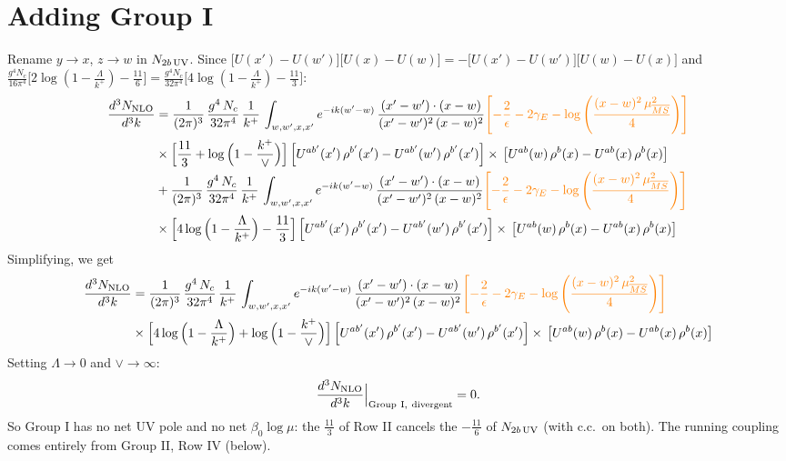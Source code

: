 \documentclass[9pt]{article}
\numberwithin{equation}{section}
\begin{document}
\section{Adding Group I}
Rename $y\to x$, $z\to w$ in $N_{2b\,\rm UV}$. Since $\big[U(x')-U(w')\big]\big[U(x)-U(w)\big]=-\big[U(x')-U(w')\big]\big[U(w)-U(x)\big]$ and $\frac{g^{4}N_{c}}{16\pi^{4}}\big[2\log(1-\frac{\Lambda}{k^{+}})-\frac{11}{6}\big]=\frac{g^{4}N_{c}}{32\pi^{4}}\big[4\log(1-\frac{\Lambda}{k^{+}})-\frac{11}{3}\big]$:
\begin{align}
\frac{d^{3}N_{\rm NLO}}{d^{3}k} & = \frac{1}{(2\pi)^{3}}\, \frac{g^{4}\,N_{c}}{32\pi^{4}}\,\frac{1}{k^{+}}\, \int_{w, w',x,x'} e^{-ik(w^\prime-w)}\,\frac{(x'-w')\cdot (x-w)}{(x'-w')^{2}\, (x-w)^{2}}{\color{orange}\left[-\frac{2}{\epsilon}-2\gamma_{E}-\log{\left(\frac{(x-w)^{2}\,\mu^{2}_{\overline{MS}}}{4}\right)}\right]}\notag\\
&\times\Big[\frac{11}{3}+\log\Big(1-\frac{k^{+}}{\vee}\Big)\Big]\left[U^{ab'}(x')\,\rho^{b'}(x') - U^{ab'}(w')\,\rho^{b'}(x')\right]\times\,\left[U^{ab}(w)\,\rho^{b}(x) - U^{ab}(x)\,\rho^{b}(x)\right]\notag\\
&+\frac{1}{(2\pi)^{3}}\, \frac{g^{4}\,N_{c}}{32\pi^{4}}\,\frac{1}{k^{+}}\, \int_{w, w',x,x'} e^{-ik(w^\prime-w)}\,\frac{(x'-w')\cdot (x-w)}{(x'-w')^{2}\, (x-w)^{2}}{\color{orange}\left[-\frac{2}{\epsilon}-2\gamma_{E}-\log{\left(\frac{(x-w)^{2}\,\mu^{2}_{\overline{MS}}}{4}\right)}\right]}\notag\\
&\times\Big[4\log\Big(1-\frac{\Lambda}{k^{+}}\Big)-\frac{11}{3}\Big]\left[U^{ab'}(x')\,\rho^{b'}(x') - U^{ab'}(w')\,\rho^{b'}(x')\right]\times\,\left[U^{ab}(w)\,\rho^{b}(x) - U^{ab}(x)\,\rho^{b}(x)\right]
\end{align}
Simplifying, we get
\begin{align}
\frac{d^{3}N_{\rm NLO}}{d^{3}k} & = \frac{1}{(2\pi)^{3}}\, \frac{g^{4}\,N_{c}}{32\pi^{4}}\,\frac{1}{k^{+}}\, \int_{w, w',x,x'} e^{-ik(w^\prime-w)}\,\frac{(x'-w')\cdot (x-w)}{(x'-w')^{2}\, (x-w)^{2}}{\color{orange}\left[-\frac{2}{\epsilon}-2\gamma_{E}-\log{\left(\frac{(x-w)^{2}\,\mu^{2}_{\overline{MS}}}{4}\right)}\right]}\notag\\
&\times\Big[4\log\Big(1-\frac{\Lambda}{k^{+}}\Big)+\log\Big(1-\frac{k^{+}}{\vee}\Big)\Big]\left[U^{ab'}(x')\,\rho^{b'}(x') - U^{ab'}(w')\,\rho^{b'}(x')\right]\times\,\left[U^{ab}(w)\,\rho^{b}(x) - U^{ab}(x)\,\rho^{b}(x)\right]
\end{align}
Setting $\Lambda\to0$ and $\vee\to\infty$:
$$\frac{d^{3}N_{\rm NLO}}{d^{3}k}\Big|_{\rm Group\ I,\ divergent}=0 .$$
{\color{red}So Group I has no net UV pole and no net $\beta_{0}\log\mu$: the $\frac{11}{3}$ of Row II cancels the $-\frac{11}{6}$ of $N_{2b\,\rm UV}$ (with c.c.\ on both). The running coupling comes entirely from Group II, Row IV (below).}
\end{document}
